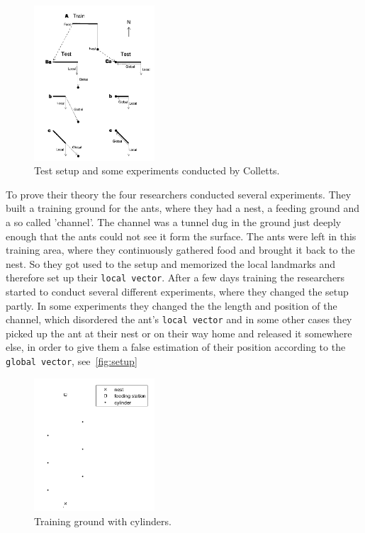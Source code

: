 \documentclass[11pt]{article}
\begin{document}
\begin{figure}
	\includegraphics[width=0.4\textwidth]{experiments_setup.png}
	\caption{Test setup and some experiments conducted by Colletts. \cite{wehner}}
	\label{fig:setup}
\end{figure}

		To prove their theory the four researchers conducted several experiments. They built a training ground for the ants, where they had a nest, a feeding ground and a so called 'channel'. The channel was a tunnel dug in the ground just deeply enough that the ants could not see it form the surface. The ants were left in this training area, where they continuously gathered food and brought it back to the nest. So they got used to the setup and memorized the local landmarks and therefore set up their \texttt{local vector}. After a few days training the researchers started to conduct several different experiments, where they changed the setup partly. In some experiments they changed the the length and position of the channel, which disordered the ant's \texttt{local vector} and in some other cases they picked up the ant at their nest or on their way home and released it somewhere else, in order to give them a false estimation of their position according to the \texttt{global vector}, see~\vref{fig:setup}


\begin{figure}
	\includegraphics[width=0.4\textwidth]{cylinders.png}
	\caption{Training ground with cylinders.}
	\label{fig:cylinders}
\end{figure}
\end{document}
